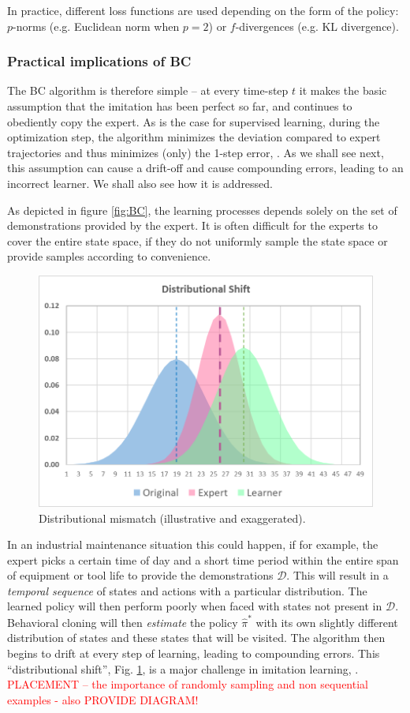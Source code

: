 \documentclass{article}
\begin{document}
In practice, different loss functions are used depending on the form of the policy: $p$-norms (e.g. Euclidean norm when $p=2$) or $f$-divergences (e.g. KL divergence).

\subsubsection{Practical implications of BC}
The BC algorithm is therefore simple -- at every time-step $t$ it makes the basic assumption that the imitation has been perfect so far, and continues to obediently copy the expert. As is the case for supervised learning, during the optimization step, the algorithm minimizes the deviation compared to expert trajectories and thus minimizes (only) the 1-step error, \citep{yue2018imitation}. As we shall see next, this assumption can cause a drift-off and cause compounding errors, leading to an incorrect learner. We shall also see how it is addressed. 

As depicted in figure \ref{fig:BC}, the learning processes depends solely on the set of demonstrations provided by the expert. It is often difficult for the experts to cover the entire state space, if they do not uniformly sample the state space or provide samples according to convenience.

\begin{figure}[H]
	\centering
	\includegraphics[width=0.6\linewidth]{images/DistributionalShift.png}
	\caption{Distributional mismatch (illustrative and exaggerated).}
	\label{fig:DistribShift}
\end{figure}

In an industrial maintenance situation this could happen, if for example, the expert picks a certain time of day and a short time period within the entire span of equipment or tool life to provide the demonstrations $\mathcal{D}$.  This will result in a \textit{temporal sequence} of states and actions with a particular distribution. The learned policy will then perform poorly when faced with states not present in $\mathcal{D}$. Behavioral cloning will then \textit{estimate} the policy ${\hat{\pi}}^*$ with its own slightly different distribution of states and these states  that will be visited. The algorithm then begins to drift at every step of learning, leading to compounding errors. This ``distributional shift'', Fig. \ref{fig:DistribShift}, is a major challenge in imitation learning, \citep{yue2018imitation, stanford-lectures}. \textcolor{red}{PLACEMENT -- the importance of randomly sampling and non sequential examples - also PROVIDE DIAGRAM!} 
\end{document}
